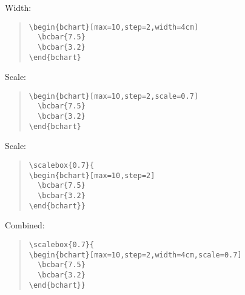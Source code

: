 \documentclass{article}
\begin{document}
Width:
\begin{quote}\small
\begin{verbatim}
\begin{bchart}[max=10,step=2,width=4cm]
  \bcbar{7.5}
  \bcbar{3.2}
\end{bchart}
\end{verbatim}
\end{quote}
\begin{quote}
\begin{bchart}[max=10,step=2,width=4cm]
\end{bchart}
\end{quote}

Scale:
\begin{quote}\small
\begin{verbatim}
\begin{bchart}[max=10,step=2,scale=0.7]
  \bcbar{7.5}
  \bcbar{3.2}
\end{bchart}
\end{verbatim}
\end{quote}
\begin{quote}
\begin{bchart}[max=10,step=2,scale=0.7]
\end{bchart}
\end{quote}

Scale:
\begin{quote}\small
\begin{verbatim}
\scalebox{0.7}{
\begin{bchart}[max=10,step=2]
  \bcbar{7.5}
  \bcbar{3.2}
\end{bchart}}
\end{verbatim}
\end{quote}
\begin{quote}
\end{quote}

Combined:
\begin{quote}\small
\begin{verbatim}
\scalebox{0.7}{
\begin{bchart}[max=10,step=2,width=4cm,scale=0.7]
  \bcbar{7.5}
  \bcbar{3.2}
\end{bchart}}
\end{verbatim}
\end{quote}
\begin{quote}
\end{quote}
\end{document}
